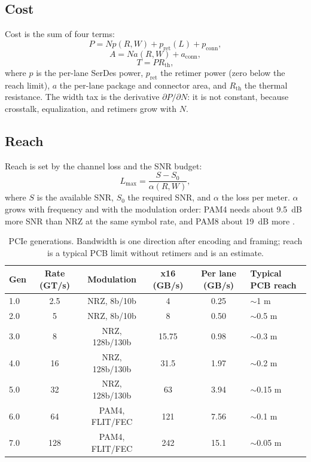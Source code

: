 \documentclass[10pt,letterpaper]{article}
\begin{document}
\subsection{Cost}

Cost is the sum of four terms:
\begin{equation}
P = N p(R,W) + p_{\mathrm{ret}}(L) + p_{\mathrm{conn}},
\label{eq:power}
\end{equation}
\begin{equation}
A = N a(R,W) + a_{\mathrm{conn}},
\label{eq:area}
\end{equation}
\begin{equation}
T = P R_{\mathrm{th}},
\label{eq:thermal}
\end{equation}
where $p$ is the per-lane SerDes power, $p_{\mathrm{ret}}$ the retimer power (zero below the reach limit), $a$ the per-lane package and connector area, and $R_{\mathrm{th}}$ the thermal resistance. The width tax is the derivative $\partial P/\partial N$: it is not constant, because crosstalk, equalization, and retimers grow with $N$.

\subsection{Reach}

Reach is set by the channel loss and the SNR budget:
\begin{equation}
L_{\max} = \frac{S - S_0}{\alpha(R,W)},
\label{eq:reach}
\end{equation}
where $S$ is the available SNR, $S_0$ the required SNR, and $\alpha$ the loss per meter. $\alpha$ grows with frequency and with the modulation order: PAM4 needs about 9.5~dB more SNR than NRZ at the same symbol rate, and PAM8 about 19~dB more \cite{pam4,shannon}.

\begin{table}[t]
\centering
\caption{PCIe generations. Bandwidth is one direction after encoding and framing; reach is a typical PCB limit without retimers and is an estimate.}
\label{tab:gens}
\small
\begin{tabularx}{\linewidth}{@{}lccccX@{}}
\toprule
Gen & Rate (GT/s) & Modulation & x16 (GB/s) & Per lane (GB/s) & Typical PCB reach \\
\midrule
1.0 & 2.5 & NRZ, 8b/10b & 4 & 0.25 & $\sim$1 m \\
2.0 & 5 & NRZ, 8b/10b & 8 & 0.50 & $\sim$0.5 m \\
3.0 & 8 & NRZ, 128b/130b & 15.75 & 0.98 & $\sim$0.3 m \\
4.0 & 16 & NRZ, 128b/130b & 31.5 & 1.97 & $\sim$0.2 m \\
5.0 & 32 & NRZ, 128b/130b & 63 & 3.94 & $\sim$0.15 m \\
6.0 & 64 & PAM4, FLIT/FEC & 121 & 7.56 & $\sim$0.1 m \\
7.0 & 128 & PAM4, FLIT/FEC & 242 & 15.1 & $\sim$0.05 m \\
\bottomrule
\end{tabularx}
\end{table}
\end{document}
